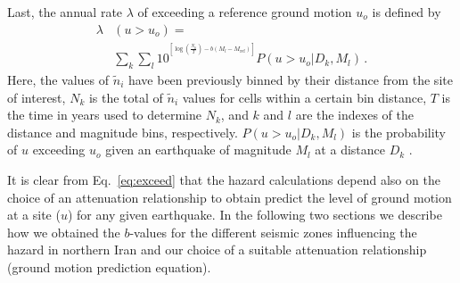 Last, the annual rate $\lambda$ of exceeding a reference ground motion $u_o$ is defined by
% 
\begin{align}
	\lambda & \left( u > u_o \right) = \nonumber \\
		& \sum_{k} \sum_{l} 10^{ {}^{ \left[ \log \left( \frac{ N_{k} }{ T } \right) - b \left( M_l - M_{\mathrm{ref}} \right) \right] } }
		P \left( u > u_o | D_k , M_l \right)
		\, .
	\label{eq:exceed}
\end{align}
% 
Here, the values of $\tilde{n}_i$ have been previously binned by their distance from the site of interest, $N_k$ is the total of $\tilde{n}_i$ values for cells within a certain bin distance, $T$ is the time in years used to determine $N_k$, and $k$ and $l$ are the indexes of the distance and magnitude bins, respectively. $P ( u > u_o | D_k , M_l )$ is the probability of $u$ exceeding $u_o$ given an earthquake of magnitude $M_l$ at a distance $D_k$ \citep{Frankel1995}.

It is clear from Eq.~\ref{eq:exceed} that the hazard calculations depend also on the choice of an attenuation relationship to obtain predict the level of ground motion at a site ($u$) for any given earthquake. In the following two sections we describe how we obtained the $b$-values for the different seismic zones influencing the hazard in northern Iran and our choice of a suitable attenuation relationship (ground motion prediction equation).








